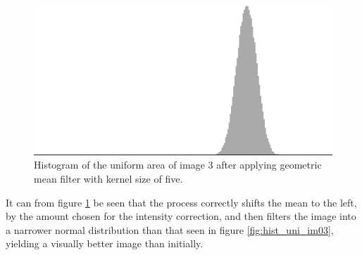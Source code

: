 \begin{figure}[H]
\centering
\includegraphics[width= 0.9 \linewidth]{../code/images/histogram_uniform_geometrical_03}
\caption{Histogram of the uniform area of image 3 after applying geometric mean filter with kernel size of five.}
\label{fig:hist_uni_geo_im03}
\end{figure}


It can from figure \ref{fig:hist_uni_geo_im03} be seen that the process correctly shifts the mean to the left, by the amount chosen for the intensity correction, and then filters the image into a narrower normal distribution than that seen in figure \ref{fig:hist_uni_im03}, yielding a visually better image than initially.





